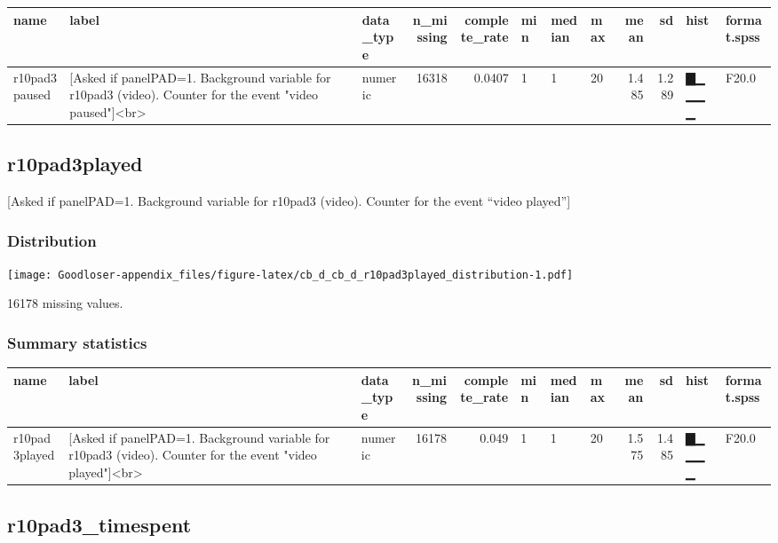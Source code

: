 \documentclass[
]{book}
\begin{document}
\begin{tabular}{l|l|l|r|r|l|l|l|r|r|l|l}
\hline
name & label & data_type & n_missing & complete_rate & min & median & max & mean & sd & hist & format.spss\\
\hline
r10pad3paused & [Asked if panelPAD=1. Background variable for r10pad3 (video). Counter for the event "video paused"]<br> & numeric & 16318 & 0.0407 & 1 & 1 & 20 & 1.485 & 1.289 & ▇▁▁▁▁ & F20.0\\
\hline
\end{tabular}

\hypertarget{r10pad3played}{%
\subsection{r10pad3played}\label{r10pad3played}}

{[}Asked if panelPAD=1. Background variable for r10pad3 (video). Counter for the event ``video played''{]}

\hypertarget{r10pad3played_distribution}{%
\subsubsection{Distribution}\label{r10pad3played_distribution}}

\texttt{[image: Goodloser-appendix\_files/figure-latex/cb\_d\_cb\_d\_r10pad3played\_distribution-1.pdf]}

16178 missing values.

\hypertarget{r10pad3played_summary}{%
\subsubsection{Summary statistics}\label{r10pad3played_summary}}

\begin{tabular}{l|l|l|r|r|l|l|l|r|r|l|l}
\hline
name & label & data_type & n_missing & complete_rate & min & median & max & mean & sd & hist & format.spss\\
\hline
r10pad3played & [Asked if panelPAD=1. Background variable for r10pad3 (video). Counter for the event "video played"]<br> & numeric & 16178 & 0.049 & 1 & 1 & 20 & 1.575 & 1.485 & ▇▁▁▁▁ & F20.0\\
\hline
\end{tabular}

\hypertarget{r10pad3_timespent}{%
\subsection{r10pad3\_timespent}\label{r10pad3_timespent}}
\end{document}
